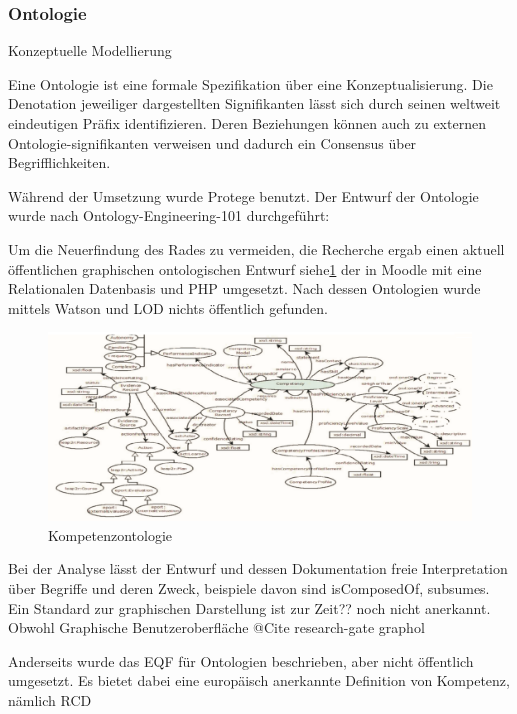 \documentclass[
12pt,
english,
ngerman,
headsepline,
twoside,
openright,
numbers=noenddot,version=first
]{scrreprt}
\begin{document}
\subsubsection{Ontologie}{Konzeptuelle Modellierung}
\label{subsec:ontology}

Eine Ontologie ist eine formale Spezifikation über eine Konzeptualisierung\cite{ontoWhat}. Die Denotation jeweiliger dargestellten Signifikanten lässt sich durch seinen weltweit eindeutigen Präfix identifizieren. Deren Beziehungen können auch zu externen Ontologie-signifikanten verweisen und dadurch ein Consensus über Begrifflichkeiten. 

Während der Umsetzung wurde Protege\cite{Protégé} benutzt.
Der Entwurf der Ontologie wurde nach Ontology-Engineering-101 durchgeführt:


Um die Neuerfindung des Rades zu vermeiden, die Recherche ergab einen aktuell öffentlichen graphischen ontologischen Entwurf\cite{ontoMoodle} siehe\ref{fig:competence-ontology} der in Moodle mit eine Relationalen Datenbasis und PHP umgesetzt. Nach dessen Ontologien wurde mittels Watson\cite{Watson} und LOD\cite{LOD} nichts öffentlich gefunden. 


\begin{figure}[h]
	\centering
	\includegraphics[angle=90]{pics/competency-ontology.eps}
	\caption{Kompetenzontologie}
	\label{fig:competence-ontology}
\end{figure}

Bei der Analyse lässt der Entwurf und dessen Dokumentation freie Interpretation über Begriffe und deren Zweck, beispiele davon sind \glqq isComposedOf\grqq, \glqq subsumes\grqq. Ein Standard zur graphischen Darstellung ist zur Zeit?? noch nicht anerkannt. Obwohl Graphische Benutzeroberfläche  @Cite research-gate graphol

Anderseits wurde das \acrshort{EQF} für Ontologien beschrieben, aber nicht öffentlich umgesetzt. Es bietet dabei eine europäisch anerkannte Definition von Kompetenz, nämlich RCD\cite{eqfCompetency}
\end{document}
